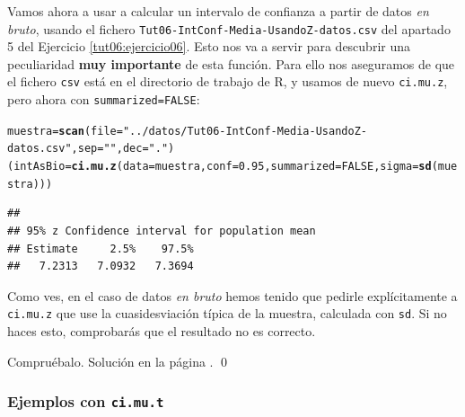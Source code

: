 \documentclass[10pt,a4paper]{article}\usepackage[]{graphicx}\usepackage[]{color}
\makeatletter
\newcommand{\hlnum}[1]{\textcolor[rgb]{0.686,0.059,0.569}{#1}}%
\newcommand{\hlstr}[1]{\textcolor[rgb]{0.192,0.494,0.8}{#1}}%
\newcommand{\hlstd}[1]{\textcolor[rgb]{0.345,0.345,0.345}{#1}}%
\newcommand{\hlkwb}[1]{\textcolor[rgb]{0.69,0.353,0.396}{#1}}%
\newcommand{\hlkwc}[1]{\textcolor[rgb]{0.333,0.667,0.333}{#1}}%
\newcommand{\hlkwd}[1]{\textcolor[rgb]{0.737,0.353,0.396}{\textbf{#1}}}%
\newenvironment{kframe}{%
 \def\at@end@of@kframe{}%
 \ifinner\ifhmode%
  \def\at@end@of@kframe{\end{minipage}}%
  \begin{minipage}{\columnwidth}%
 \fi\fi%
 \def\FrameCommand##1{\hskip\@totalleftmargin \hskip-\fboxsep
 \colorbox{shadecolor}{##1}\hskip-\fboxsep
     \hskip-\linewidth \hskip-\@totalleftmargin \hskip\columnwidth}%
 \MakeFramed {\advance\hsize-\width
   \@totalleftmargin\z@ \linewidth\hsize
   \@setminipage}}%
 {\par\unskip\endMakeFramed%
 \at@end@of@kframe}
\newenvironment{knitrout}{}{} %
\makeatother
\begin{document}
Vamos ahora a usar a calcular un intervalo de confianza a partir de datos {\em en bruto}, usando el fichero {\tt Tut06-IntConf-Media-UsandoZ-datos.csv} del apartado 5 del Ejercicio \ref{tut06:ejercicio06}. Esto nos va a servir para descubrir una peculiaridad {\bf muy importante} de esta función. Para ello nos aseguramos de que el fichero {\tt csv} está en el directorio de trabajo de R, y usamos de nuevo {\tt ci.mu.z}, pero ahora con {\tt summarized=FALSE}:
\begin{knitrout}
\color{fgcolor}\begin{kframe}
\begin{alltt}
\hlstd{muestra} \hlkwb{=} \hlkwd{scan}\hlstd{(}\hlkwc{file}\hlstd{=}\hlstr{"../datos/Tut06-IntConf-Media-UsandoZ-datos.csv"}\hlstd{,} \hlkwc{sep}\hlstd{=}\hlstr{" "}\hlstd{,} \hlkwc{dec}\hlstd{=}\hlstr{"."}\hlstd{)}
\hlstd{(intAsBio} \hlkwb{=} \hlkwd{ci.mu.z}\hlstd{(}\hlkwc{data}\hlstd{=muestra,} \hlkwc{conf}\hlstd{=}\hlnum{0.95}\hlstd{,} \hlkwc{summarized}\hlstd{=}\hlnum{FALSE}\hlstd{,} \hlkwc{sigma} \hlstd{=} \hlkwd{sd}\hlstd{(muestra)))}
\end{alltt}
\begin{verbatim}
## 
## 95% z Confidence interval for population mean 
## Estimate     2.5%    97.5% 
##   7.2313   7.0932   7.3694
\end{verbatim}
\end{kframe}
\end{knitrout}
Como ves, en el caso de datos {\em en bruto} hemos tenido que pedirle explícitamente a {\tt ci.mu.z} que use la cuasidesviación típica de la muestra, calculada con {\tt sd}. Si no haces esto, comprobarás que el resultado no es correcto.
\begin{ejercicio}
\label{tut06:ejercicio24}
Compruébalo. Solución en la página \pageref{tut06:ejercicio24:sol}.
\qed
\end{ejercicio}

\subsubsection*{Ejemplos con {\tt ci.mu.t}}
\end{document}
